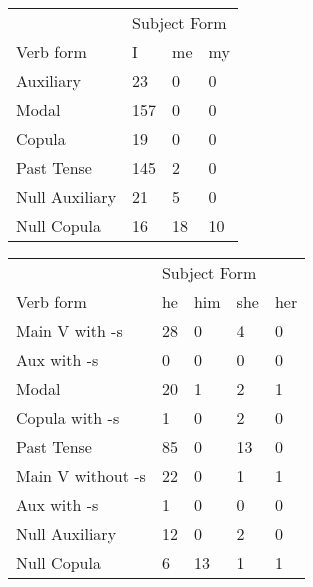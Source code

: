 \begin{table}[]
\begin{minipage}{0.5\textwidth}
    \centering
    \begin{tabular}{@{}llll@{}}
        \toprule
            &\multicolumn{3}{l}{Subject Form}\\
            \cline{2-4}
        Verb form & I & me & my \\
        \midrule
        Auxiliary & 23 & 0 & 0 \\
        Modal & 157 & 0 & 0 \\
        Copula & 19 & 0 & 0 \\
        Past Tense & 145 & 2 & 0 \\
        \hline
        Null Auxiliary & 21 & 5 & 0 \\
        Null Copula & 16 & 18 & 10 \\
        \bottomrule
    \end{tabular}
\end{minipage}
\begin{minipage}{0.5\textwidth}
    \centering
    \begin{tabular}{@{}lllll@{}}
        \toprule
            &\multicolumn{4}{l}{Subject Form}\\
            \cline{2-5}
        Verb form & he & him & she & her \\
        \midrule
        Main V with -s & 28 & 0 & 4 & 0 \\
        Aux with -s & 0 & 0 & 0 & 0 \\
        Modal & 20 & 1 & 2 & 1 \\
        Copula with -s & 1 & 0 & 2 & 0 \\
        Past Tense & 85 & 0 & 13 & 0 \\
        \hline
        Main V without -s & 22 & 0 & 1 & 1 \\
        Aux with -s & 1 & 0 & 0 & 0 \\
        Null Auxiliary & 12 & 0 & 2 & 0 \\
        Null Copula & 6 & 13 & 1 & 1 \\
        \bottomrule
    \end{tabular}
    \end{minipage}
\end{table}
